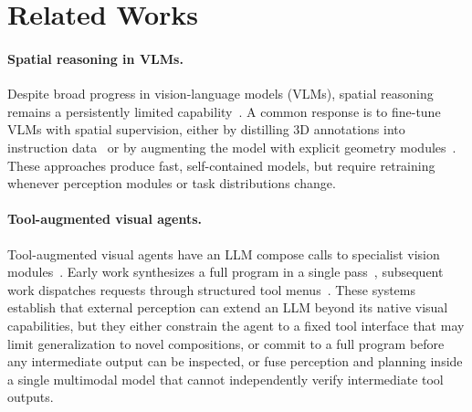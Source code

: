 \documentclass{llmxive}
\begin{document}
\section{Related Works}
\label{app:related}

\paragraph{Spatial reasoning in VLMs.}
Despite broad progress in vision-language models (VLMs), spatial reasoning remains a persistently limited capability~\citep{chen2024spatialvlm,cheng2024spatialrgpt,song2025robospatial}.
A common response is to fine-tune VLMs with spatial supervision, either by distilling 3D annotations into instruction data~\citep{chen2024spatialvlm,cheng2024spatialrgpt} or by augmenting the model with explicit geometry modules~\citep{hu2025g,fan2025vlm,zhang2026make}.
These approaches produce fast, self-contained models, but require retraining whenever perception modules or task distributions change.

\paragraph{Tool-augmented visual agents.}
Tool-augmented visual agents have an LLM compose calls to specialist vision modules~\citep{Gupta2022VisProg,surismenon2023vipergpt,shen2023hugginggpt,zhao2025pyvision,lu2026octotools}.
Early work synthesizes a full program in a single pass~\citep{Gupta2022VisProg,surismenon2023vipergpt}, subsequent work dispatches requests through structured tool menus~\citep{shen2023hugginggpt,lu2026octotools}.
These systems establish that external perception can extend an LLM beyond its native visual capabilities, but they either constrain the agent to a fixed tool interface that may limit generalization to novel compositions, or commit to a full program before any intermediate output can be inspected, or fuse perception and planning inside a single multimodal model that cannot independently verify intermediate tool outputs.
\end{document}

